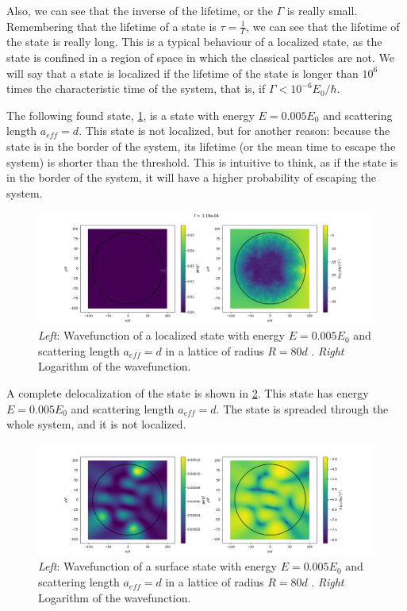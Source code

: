 Also, we can see that the inverse of the lifetime, or the $\Gamma$ is really small. Remembering that the lifetime of a state is $\tau=\frac{1}{\Gamma}$, we can see that the lifetime of the state is really long. This is a typical behaviour of a localized state, as the state is confined in a region of space in which the classical particles are not. We will say that a state is localized if the lifetime of the state is longer than $10^6$ times the characteristic time of the system, that is, if $\Gamma < 10^{-6}E_0/\hbar$.

The following found state, \cref{fig:border_state}, is a state with energy $E=0.005E_0$ and scattering length $a_{eff}=d$. This state is not localized, but for another reason: because the state is in the border of the system, its lifetime (or the mean time to escape the system) is shorter than the threshold. This is intuitive to think, as if the state is in the border of the system, it will have a higher probability of escaping the system.


\begin{figure}[ht]
    \centering
    \includegraphics[width=1\linewidth]{img/Delocish.png}
    \caption{\textit{Left}: Wavefunction of a localized state with energy $E=0.005E_0$ and scattering length $a_{eff}=d$ in a lattice of radius $R=80d$ . \textit{Right} Logarithm of the wavefunction. }
    \label{fig:border_state}
\end{figure}

A complete delocalization of the state is shown in \cref{fig:deloc_state}. This state has energy $E=0.005E_0$ and scattering length $a_{eff}=d$. The state is spreaded through the whole system, and it is not localized.

\begin{figure}[ht]
    \centering
    \includegraphics[width=1\linewidth]{img/other_deloc.png}
    \caption{\textit{Left}: Wavefunction of a surface state with energy $E=0.005E_0$ and scattering length $a_{eff}=d$ in a lattice of radius $R=80d$ . \textit{Right} Logarithm of the wavefunction. }
    \label{fig:deloc_state}
\end{figure}

